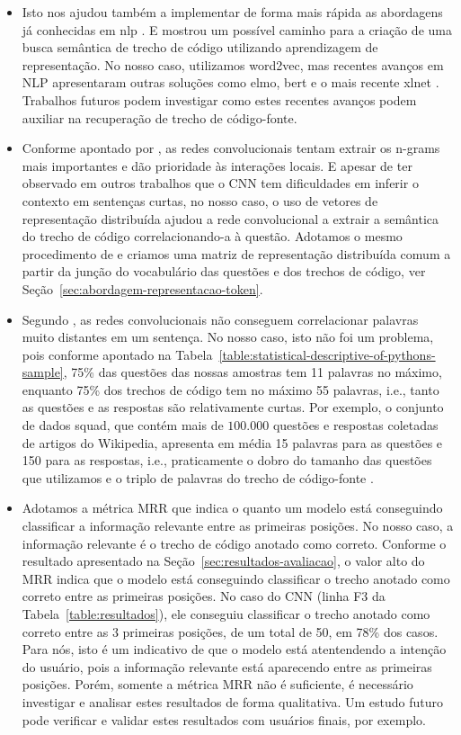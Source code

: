 \begin{itemize}
    \item Isto nos ajudou também a implementar de forma mais rápida as abordagens já conhecidas em \acrshort{nlp} \citep{feng-2015, tan-lstm-qa}. E mostrou um possível caminho para a criação de uma busca semântica de trecho de código utilizando aprendizagem de representação. No nosso caso, utilizamos \Gls{word2vec}, mas recentes avanços em NLP apresentaram outras soluções como \acrshort{elmo}, \acrshort{bert} e o mais recente \Gls{xlnet} \citep{yang2019xlNet, devlin-etal-2019-bert}. Trabalhos futuros podem investigar como estes recentes avanços podem auxiliar na recuperação de trecho de código-fonte.
    \item Conforme apontado por \cite{tom-young:trends-deep-learning-nlp}, as redes convolucionais tentam extrair os n-grams mais importantes e dão prioridade às interações locais. E apesar de \cite{tom-young:trends-deep-learning-nlp} ter observado em outros trabalhos que o CNN tem dificuldades em inferir o contexto em sentenças curtas, no nosso caso, o uso de vetores de representação distribuída ajudou a rede convolucional a extrair a semântica do trecho de código correlacionando-a à questão. Adotamos o mesmo procedimento de \cite{tan-lstm-qa} e criamos uma matriz de representação distribuída comum a partir da junção do vocabulário das questões e dos trechos de código, ver Seção~\ref{sec:abordagem-representacao-token}.
    \item Segundo \cite{Goodfellow-et-al-2016:convolutional-networks}, as redes convolucionais não conseguem correlacionar palavras muito distantes em um sentença. No nosso caso, isto não foi um problema, pois conforme apontado na Tabela~\ref{table:statistical-descriptive-of-pythons-sample}, 75\% das questões das nossas amostras tem 11 palavras no máximo, enquanto 75\% dos trechos de código tem no máximo 55 palavras, i.e., tanto as questões e as respostas são relativamente curtas. Por exemplo, o conjunto de dados \acrshort{squad}, que contém mais de $100.000$ questões e respostas coletadas de artigos do Wikipedia, apresenta em média 15 palavras para as questões e 150 para as respostas, i.e., praticamente o dobro do tamanho das questões que utilizamos e o triplo de palavras do trecho de código-fonte \citep{rajpurkar-etal-2016-squad}. 
    \item Adotamos a métrica MRR que indica o quanto um modelo está conseguindo classificar a informação relevante entre as primeiras posições. No nosso caso, a informação relevante é o trecho de código anotado como correto. Conforme o resultado apresentado na Seção~\ref{sec:resultados-avaliacao}, o valor alto do MRR indica que o modelo está conseguindo classificar o trecho anotado como correto entre as primeiras posições. No caso do CNN (linha F3 da Tabela~\ref{table:resultados}), ele conseguiu classificar o trecho anotado como correto entre as 3 primeiras posições, de um total de 50, em 78\% dos casos. Para nós, isto é um indicativo de que o modelo está atentendendo a intenção do usuário, pois a informação relevante está aparecendo entre as primeiras posições. Porém, somente a métrica MRR não é suficiente, é necessário investigar e analisar estes resultados de forma qualitativa. Um estudo futuro pode verificar e validar estes resultados com usuários finais, por exemplo. 
\end{itemize}


